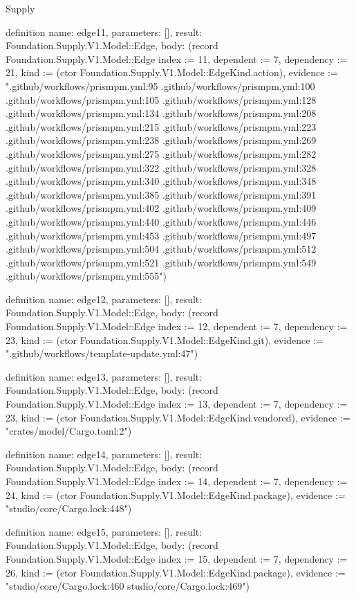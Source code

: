 \begin{lexlean}{Supply}
\begin{semanticmodule}
definition{
  name: edge11,
  parameters: [],
  result: Foundation.Supply.V1.Model::Edge,
  body: (record Foundation.Supply.V1.Model::Edge {index := 11, dependent := 7, dependency := 21, kind := (ctor Foundation.Supply.V1.Model::EdgeKind.action), evidence := ".github/workflows/prismpm.yml:95 .github/workflows/prismpm.yml:100 .github/workflows/prismpm.yml:105 .github/workflows/prismpm.yml:128 .github/workflows/prismpm.yml:134 .github/workflows/prismpm.yml:208 .github/workflows/prismpm.yml:215 .github/workflows/prismpm.yml:223 .github/workflows/prismpm.yml:238 .github/workflows/prismpm.yml:269 .github/workflows/prismpm.yml:275 .github/workflows/prismpm.yml:282 .github/workflows/prismpm.yml:322 .github/workflows/prismpm.yml:328 .github/workflows/prismpm.yml:340 .github/workflows/prismpm.yml:348 .github/workflows/prismpm.yml:385 .github/workflows/prismpm.yml:391 .github/workflows/prismpm.yml:402 .github/workflows/prismpm.yml:409 .github/workflows/prismpm.yml:440 .github/workflows/prismpm.yml:446 .github/workflows/prismpm.yml:453 .github/workflows/prismpm.yml:497 .github/workflows/prismpm.yml:504 .github/workflows/prismpm.yml:512 .github/workflows/prismpm.yml:521 .github/workflows/prismpm.yml:549 .github/workflows/prismpm.yml:555"})
}

definition{
  name: edge12,
  parameters: [],
  result: Foundation.Supply.V1.Model::Edge,
  body: (record Foundation.Supply.V1.Model::Edge {index := 12, dependent := 7, dependency := 23, kind := (ctor Foundation.Supply.V1.Model::EdgeKind.git), evidence := ".github/workflows/template-update.yml:47"})
}

definition{
  name: edge13,
  parameters: [],
  result: Foundation.Supply.V1.Model::Edge,
  body: (record Foundation.Supply.V1.Model::Edge {index := 13, dependent := 7, dependency := 23, kind := (ctor Foundation.Supply.V1.Model::EdgeKind.vendored), evidence := "crates/model/Cargo.toml:2"})
}

definition{
  name: edge14,
  parameters: [],
  result: Foundation.Supply.V1.Model::Edge,
  body: (record Foundation.Supply.V1.Model::Edge {index := 14, dependent := 7, dependency := 24, kind := (ctor Foundation.Supply.V1.Model::EdgeKind.package), evidence := "studio/core/Cargo.lock:448"})
}

definition{
  name: edge15,
  parameters: [],
  result: Foundation.Supply.V1.Model::Edge,
  body: (record Foundation.Supply.V1.Model::Edge {index := 15, dependent := 7, dependency := 26, kind := (ctor Foundation.Supply.V1.Model::EdgeKind.package), evidence := "studio/core/Cargo.lock:460 studio/core/Cargo.lock:469"})
}


\end{semanticmodule}
\end{lexlean}
